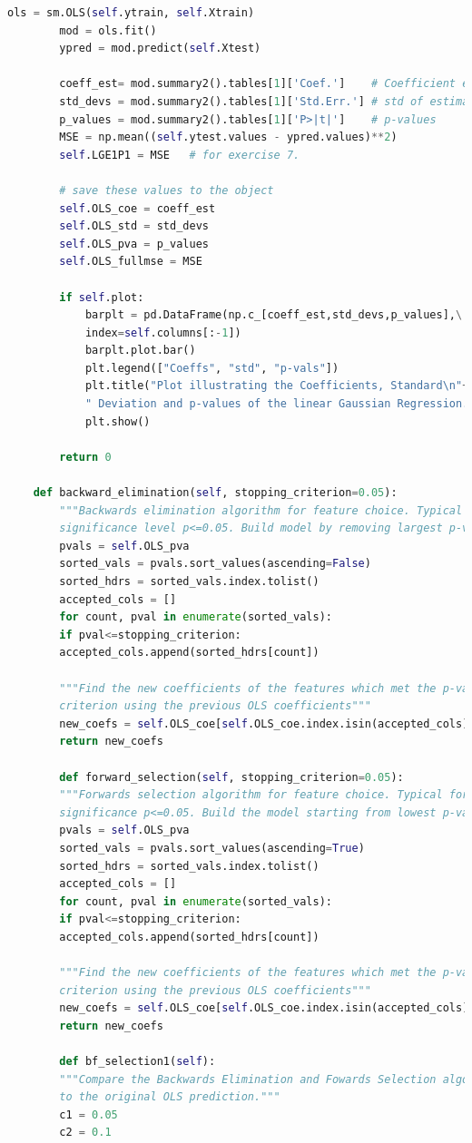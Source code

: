 \documentclass[]{article}
\begin{document}
\begin{lstlisting}[language=Python]
		ols = sm.OLS(self.ytrain, self.Xtrain)
		mod = ols.fit()
		ypred = mod.predict(self.Xtest)
		
		coeff_est= mod.summary2().tables[1]['Coef.']    # Coefficient estimates
		std_devs = mod.summary2().tables[1]['Std.Err.'] # std of estimates
		p_values = mod.summary2().tables[1]['P>|t|']    # p-values
		MSE = np.mean((self.ytest.values - ypred.values)**2)
		self.LGE1P1 = MSE   # for exercise 7.
		
		# save these values to the object
		self.OLS_coe = coeff_est
		self.OLS_std = std_devs
		self.OLS_pva = p_values
		self.OLS_fullmse = MSE
		
		if self.plot:
			barplt = pd.DataFrame(np.c_[coeff_est,std_devs,p_values],\
			index=self.columns[:-1])
			barplt.plot.bar()
			plt.legend(["Coeffs", "std", "p-vals"])
			plt.title("Plot illustrating the Coefficients, Standard\n"+\
			" Deviation and p-values of the linear Gaussian Regression.")
			plt.show()
		
		return 0
	
	def backward_elimination(self, stopping_criterion=0.05):
		"""Backwards elimination algorithm for feature choice. Typical to set
		significance level p<=0.05. Build model by removing largest p-values"""
		pvals = self.OLS_pva
		sorted_vals = pvals.sort_values(ascending=False)
		sorted_hdrs = sorted_vals.index.tolist()
		accepted_cols = []
		for count, pval in enumerate(sorted_vals):
		if pval<=stopping_criterion:
		accepted_cols.append(sorted_hdrs[count])
		
		"""Find the new coefficients of the features which met the p-value
		criterion using the previous OLS coefficients"""
		new_coefs = self.OLS_coe[self.OLS_coe.index.isin(accepted_cols)]
		return new_coefs
		
		def forward_selection(self, stopping_criterion=0.05):
		"""Forwards selection algorithm for feature choice. Typical for the
		significance p<=0.05. Build the model starting from lowest p-values"""
		pvals = self.OLS_pva
		sorted_vals = pvals.sort_values(ascending=True)
		sorted_hdrs = sorted_vals.index.tolist()
		accepted_cols = []
		for count, pval in enumerate(sorted_vals):
		if pval<=stopping_criterion:
		accepted_cols.append(sorted_hdrs[count])
		
		"""Find the new coefficients of the features which met the p-value
		criterion using the previous OLS coefficients"""
		new_coefs = self.OLS_coe[self.OLS_coe.index.isin(accepted_cols)]
		return new_coefs
		
		def bf_selection1(self):
		"""Compare the Backwards Elimination and Fowards Selection algorithms
		to the original OLS prediction."""
		c1 = 0.05
		c2 = 0.1
		

\end{lstlisting}
\end{document}
